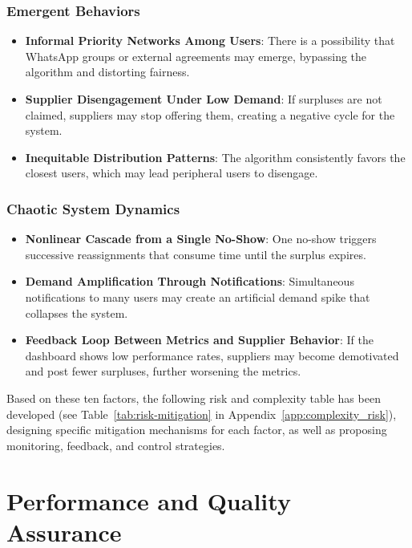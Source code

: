 \documentclass[conference]{IEEEtran}
\begin{document}
\subsubsection{Emergent Behaviors}

\begin{itemize}
    \item \textbf{Informal Priority Networks Among Users}: There is a possibility that WhatsApp groups or external agreements may emerge, bypassing the algorithm and distorting fairness.
    \item \textbf{Supplier Disengagement Under Low Demand}: If surpluses are not claimed, suppliers may stop offering them, creating a negative cycle for the system.
    \item \textbf{Inequitable Distribution Patterns}: The algorithm consistently favors the closest users, which may lead peripheral users to disengage.
\end{itemize}

\subsubsection{Chaotic System Dynamics}

\begin{itemize}
    \item \textbf{Nonlinear Cascade from a Single No-Show}: One no-show triggers successive reassignments that consume time until the surplus expires.
    \item \textbf{Demand Amplification Through Notifications}: Simultaneous notifications to many users may create an artificial demand spike that collapses the system.
    \item \textbf{Feedback Loop Between Metrics and Supplier Behavior}: If the dashboard shows low performance rates, suppliers may become demotivated and post fewer surpluses, further worsening the metrics.
\end{itemize}

Based on these ten factors, the following risk and complexity table has been developed (see Table~\ref{tab:risk-mitigation} in Appendix~\ref{app:complexity_risk}), designing specific mitigation mechanisms for each factor, as well as proposing monitoring, feedback, and control strategies.

\section{Performance and Quality Assurance}
\end{document}

